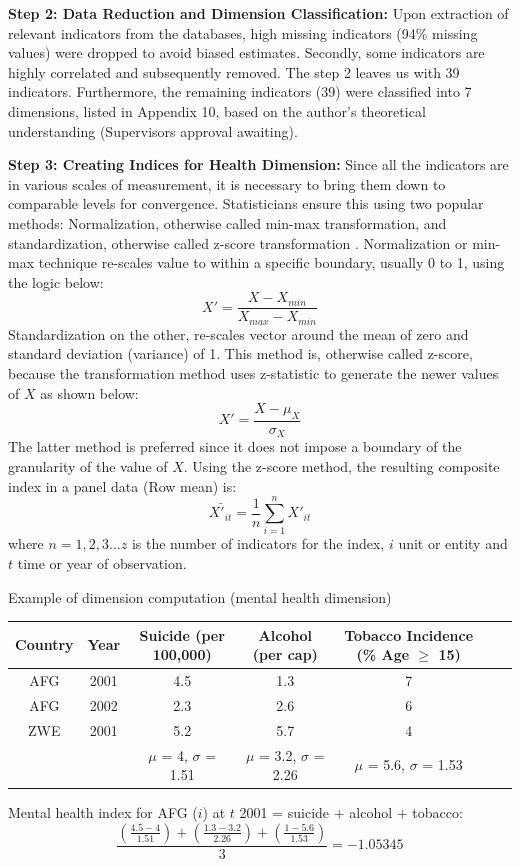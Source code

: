 \textbf{Step 2: Data Reduction and Dimension Classification:} Upon extraction of relevant indicators from the databases, high missing indicators (94\% missing values) were dropped to avoid biased estimates. Secondly, some indicators are highly correlated and subsequently removed. The step 2 leaves us with 39 indicators. Furthermore, the remaining indicators (39) were classified into 7 dimensions, listed in Appendix 10, based on the author's theoretical understanding (Supervisors approval awaiting). 

\textbf{Step 3: Creating Indices for Health Dimension:} Since all the indicators are in various scales of measurement, it is necessary to bring them down to comparable levels for convergence. Statisticians ensure this using two popular methods: Normalization, otherwise called min-max transformation, and standardization, otherwise called z-score transformation \parencite{bhandari2023feature}. Normalization or min-max technique re-scales value to within a specific boundary, usually 0 to 1, using the logic below: $$ X' = \frac{X - X_{min}}{X_{max} - X_{min}} $$
Standardization on the other, re-scales vector around the mean of zero and standard deviation (variance) of 1. This method is, otherwise called z-score, because the transformation method uses z-statistic to generate the newer values of $X$ as shown below: 
$$ X' = \frac{X - \mu_{X}}{\sigma_{X}} $$
The latter method is preferred since it does not impose a boundary of the granularity of the value of $X$.
Using the z-score method, the resulting composite index in a panel data (Row mean) is: $$\bar{X'_{it}} = \frac{1}{n} \sum_{i=1}^{n} X'_{it}$$
where $n = 1, 2, 3...z$ is the number of indicators for the index, $i$ unit or entity and $t$ time or year of observation. 
\begin{table}[H]
    \centering
 Example of dimension computation (mental health dimension)
    \begin{tabular}{ccccccc}
        \toprule
        Country & Year & Suicide (per 100,000) & Alcohol (per cap) & Tobacco Incidence (\% Age $\geq$ 15) \\
        \midrule
        AFG & 2001 & 4.5 & 1.3 & 7 \\
        AFG & 2002 & 2.3 & 2.6 & 6 \\
        ZWE & 2001 & 5.2 & 5.7 & 4 \\
        \midrule
        & & $\mu$ = 4, $\sigma$ = 1.51 & $\mu$ = 3.2, $\sigma$ = 2.26 & $\mu$ = 5.6, $\sigma$ = 1.53 \\
        \bottomrule
    \end{tabular}
\end{table}
Mental health index for AFG ($i$) at $t$ 2001 = suicide + alcohol + tobacco: 
\[
\frac{{\left(\frac{{4.5 - 4}}{{1.51}}\right) + \left(\frac{{1.3 - 3.2}}{{2.26}}\right) + \left(\frac{{1 - 5.6}}{{1.53}}\right)}}{3} = -1.05345
\]


